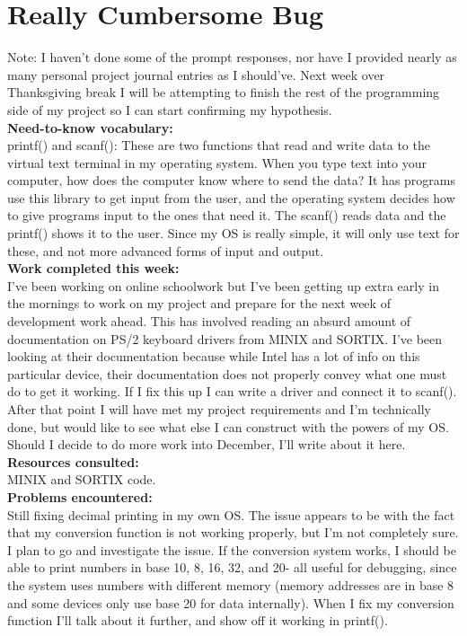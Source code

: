 \documentclass[11pt]{article}
\begin{document}
\section{Really Cumbersome Bug}
Note: I haven't done some of the prompt responses, nor have I provided nearly as many personal project journal entries as I should've. Next week over Thanksgiving break I will be attempting to finish the rest of the programming side of my project so I can start confirming my hypothesis.\\
\textbf{Need-to-know vocabulary:}\\
printf() and scanf(): These are two functions that read and write data to the virtual text terminal in my operating system. When you type text into your computer, how does the computer know where to send the data? It has programs use this library to get input from the user, and the operating system decides how to give programs input to the ones that need it. The scanf() reads data and the printf() shows it to the user. Since my OS is really simple, it will only use text for these, and not more advanced forms of input and output.\\
\textbf{Work completed this week:}\\
I've been working on online schoolwork but I've been getting up extra early in the mornings to work on my project and prepare for the next week of development work ahead. This has involved reading an absurd amount of documentation on PS/2 keyboard drivers from MINIX and SORTIX. I've been looking at their documentation because while Intel has a lot of info on this particular device, their documentation does not properly convey what one must do to get it working. If I fix this up I can write a driver and connect it to scanf(). After that point I will have met my project requirements and I'm technically done, but would like to see what else I can construct with the powers of my OS. Should I decide to do more work into December, I'll write about it here.\\
\textbf{Resources consulted:}\\
MINIX and SORTIX code.\\
\textbf{Problems encountered:}\\
Still fixing decimal printing in my own OS. The issue appears to be with the fact that my conversion function is not working properly, but I'm not completely sure. I plan to go and investigate the issue. If the conversion system works, I should be able to print numbers in base 10, 8, 16, 32, and 20- all useful for debugging, since the system uses numbers with different memory (memory addresses are in base 8 and some devices only use base 20 for data internally). When I fix my conversion function I'll talk about it further, and show off it working in printf().\\
\end{document}
